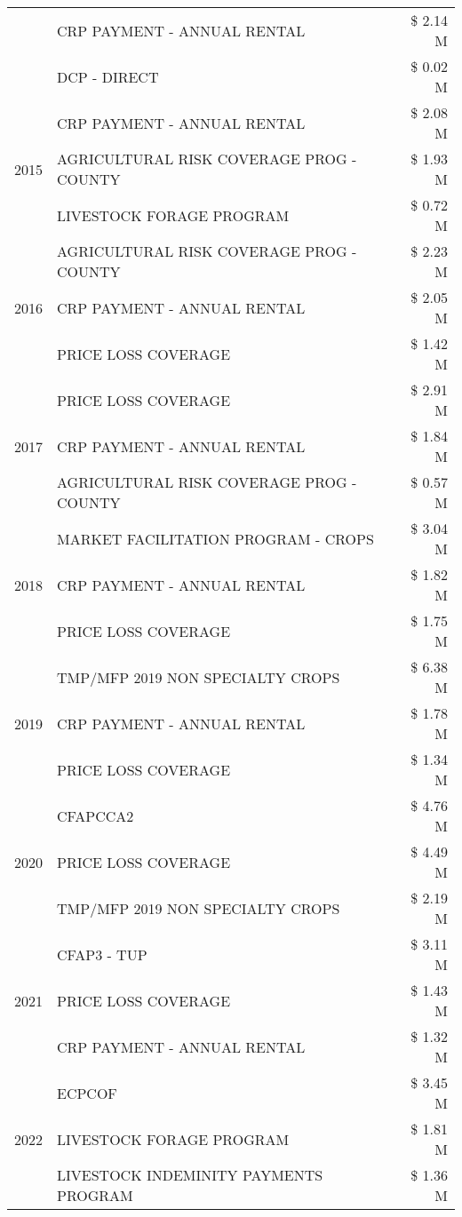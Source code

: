 \begin{tabular}{llr}
 & CRP PAYMENT - ANNUAL RENTAL & \$ 2.14 M \\
 & DCP - DIRECT & \$ 0.02 M \\
\cline{1-3}
\multirow[t]{3}{*}{2015} & CRP PAYMENT - ANNUAL RENTAL & \$ 2.08 M \\
 & AGRICULTURAL RISK COVERAGE PROG - COUNTY & \$ 1.93 M \\
 & LIVESTOCK FORAGE PROGRAM & \$ 0.72 M \\
\cline{1-3}
\multirow[t]{3}{*}{2016} & AGRICULTURAL RISK COVERAGE PROG - COUNTY & \$ 2.23 M \\
 & CRP PAYMENT - ANNUAL RENTAL & \$ 2.05 M \\
 & PRICE LOSS COVERAGE & \$ 1.42 M \\
\cline{1-3}
\multirow[t]{3}{*}{2017} & PRICE LOSS COVERAGE & \$ 2.91 M \\
 & CRP PAYMENT - ANNUAL RENTAL & \$ 1.84 M \\
 & AGRICULTURAL RISK COVERAGE PROG - COUNTY & \$ 0.57 M \\
\cline{1-3}
\multirow[t]{3}{*}{2018} & MARKET FACILITATION PROGRAM - CROPS & \$ 3.04 M \\
 & CRP PAYMENT - ANNUAL RENTAL & \$ 1.82 M \\
 & PRICE LOSS COVERAGE & \$ 1.75 M \\
\cline{1-3}
\multirow[t]{3}{*}{2019} & TMP/MFP 2019 NON SPECIALTY CROPS & \$ 6.38 M \\
 & CRP PAYMENT - ANNUAL RENTAL & \$ 1.78 M \\
 & PRICE LOSS COVERAGE & \$ 1.34 M \\
\cline{1-3}
\multirow[t]{3}{*}{2020} & CFAPCCA2 & \$ 4.76 M \\
 & PRICE LOSS COVERAGE & \$ 4.49 M \\
 & TMP/MFP 2019 NON SPECIALTY CROPS & \$ 2.19 M \\
\cline{1-3}
\multirow[t]{3}{*}{2021} & CFAP3 - TUP & \$ 3.11 M \\
 & PRICE LOSS COVERAGE & \$ 1.43 M \\
 & CRP PAYMENT - ANNUAL RENTAL & \$ 1.32 M \\
\cline{1-3}
\multirow[t]{3}{*}{2022} & ECPCOF & \$ 3.45 M \\
 & LIVESTOCK FORAGE PROGRAM & \$ 1.81 M \\
 & LIVESTOCK INDEMINITY PAYMENTS PROGRAM & \$ 1.36 M \\
\cline{1-3}
\bottomrule
\end{tabular}
